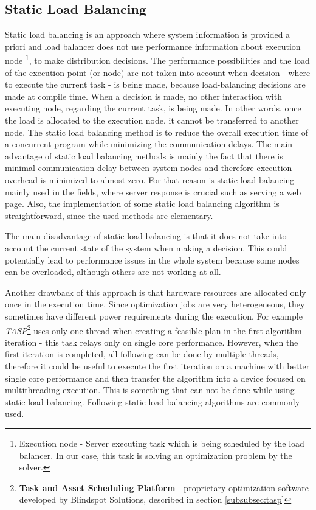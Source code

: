 \subsection{Static Load Balancing}\label{subsec:static-load-balancing}
Static load balancing is an approach where system information is provided a priori
and load balancer does not use performance information about execution node
\footnote{Execution node - Server executing task which is being scheduled by the load balancer.
In our case, this task is solving an optimization problem by the solver.},
to make distribution decisions.
The performance possibilities and the load of the execution point (or node) are not taken into account
when decision - where to execute the current task - is being made, because load-balancing decisions are made at compile time.
When a decision is made, no other interaction with executing node, regarding the current task, is being made.
In other words, once the load is allocated to the execution node, it cannot be transferred to another node.
The static load balancing method is to reduce the overall execution time of a concurrent program while minimizing the communication delays\cite{web:loadBalancingInGridComputing}.
The main advantage of static load balancing methods is mainly the fact that there is minimal communication delay between system nodes
and therefore execution overhead is minimized to almost zero.
For that reason is static load balancing mainly used in the fields, where server response is crucial such as serving a web page.
Also, the implementation of some static load balancing algorithm is straightforward, since the used methods are elementary.

The main disadvantage of static load balancing is that it does not take into account the current state of the system when making a decision.
This could potentially lead to performance issues in the whole system because some nodes can be overloaded, although others are not working at all.

Another drawback of this approach is that hardware resources are allocated only once in the execution time.
Since optimization jobs are very heterogeneous, they sometimes have different power requirements during the execution.
For example \textit{TASP}\footnote{\textbf{Task and Asset Scheduling Platform} - proprietary optimization software developed by Blindspot Solutions,
described in section \ref{subsubsec:tasp}}
uses only one thread when creating a feasible plan in the first algorithm iteration - this task relays only on single core performance.
However, when the first iteration is completed, all following can be done by multiple threads,
therefore it could be useful to execute the first iteration on a machine with better single core performance
and then transfer the algorithm into a device focused on multithreading execution.
This is something that can not be done while using static load balancing.\newline
Following static load balancing algorithms are commonly used.

